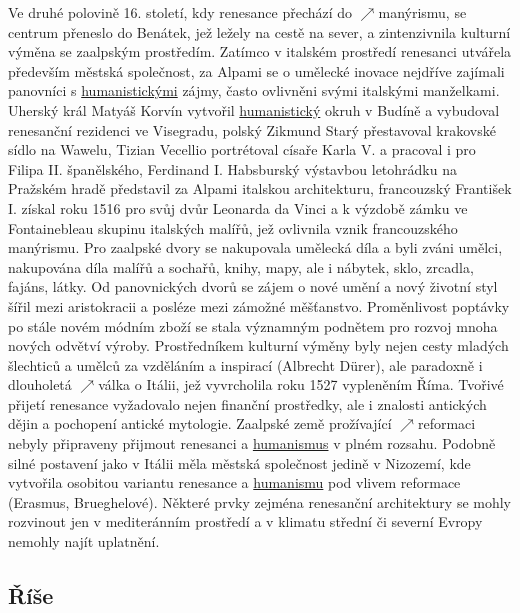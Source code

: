 \documentclass{article}
\begin{document}
  Ve druhé polovině 16. století, kdy renesance přechází do $\nearrow$manýrismu, se centrum přeneslo do Benátek, jež ležely na cestě na sever, a zintenzivnila kulturní výměna se zaalpským prostředím. Zatímco v italském prostředí renesanci utvářela především městská společnost, za Alpami se o umělecké inovace nejdříve zajímali panovníci s \hyperref[sec:humanismus]{humanistickými} zájmy, často ovlivněni svými italskými manželkami. Uherský král Matyáš Korvín vytvořil \hyperref[sec:humanismus]{humanistický} okruh v Budíně a vybudoval renesanční rezidenci ve Visegradu, polský Zikmund Starý přestavoval krakovské sídlo na Wawelu, Tizian Vecellio portrétoval císaře Karla V. a pracoval i pro Filipa II. španělského, Ferdinand I. Habsburský výstavbou letohrádku na Pražském hradě představil za Alpami italskou architekturu, francouzský František I. získal roku 1516 pro svůj dvůr Leonarda da Vinci a k výzdobě zámku ve Fontainebleau skupinu italských malířů, jež ovlivnila vznik francouzského manýrismu. Pro zaalpské dvory se nakupovala umělecká díla a byli zváni umělci, nakupována díla malířů a sochařů, knihy, mapy, ale i nábytek, sklo, zrcadla, fajáns, látky. Od panovnických dvorů se zájem o nové umění a nový životní styl šířil mezi aristokracii a posléze mezi zámožné měšťanstvo. Proměnlivost poptávky po stále novém módním zboží se stala významným podnětem pro rozvoj mnoha nových odvětví výroby. Prostředníkem kulturní výměny byly nejen cesty mladých šlechticů a umělců za vzděláním a inspirací (Albrecht Dürer), ale paradoxně i dlouholetá $\nearrow$válka o Itálii, jež vyvrcholila roku 1527 vypleněním Říma. Tvořivé přijetí renesance vyžadovalo nejen finanční prostředky, ale i znalosti antických dějin a pochopení antické mytologie. Zaalpské země prožívající $\nearrow$reformaci nebyly připraveny přijmout renesanci a \hyperref[sec:humanismus]{humanismus} v plném rozsahu. Podobně silné postavení jako v Itálii měla městská společnost jedině v Nizozemí, kde vytvořila osobitou variantu renesance a \hyperref[sec:humanismus]{humanismu} pod vlivem reformace (Erasmus, Brueghelové). Některé prvky zejména renesanční architektury se mohly rozvinout jen v mediteránním prostředí a v klimatu střední či severní Evropy nemohly najít uplatnění.

  \subsection*{Říše~\cite{Hroch:}}
  \label{sec:rise}
\end{document}
